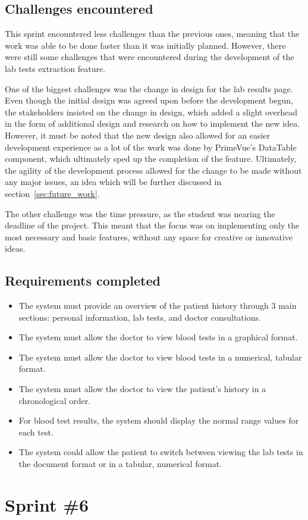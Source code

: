 
\subsection{Challenges encountered}

This sprint encountered less challenges than the previous ones, meaning that the work was able to be done faster than it was initially planned. However, there were still some challenges that were encountered during the development of the lab tests extraction feature.

One of the biggest challenges was the change in design for the lab results page. Even though the initial design was agreed upon before the development begun, the stakeholders insisted on the change in design, which added a slight overhead in the form of additional design and research on how to implement the new idea. However, it must be noted that the new design also allowed for an easier development experience as a lot of the work was done by PrimeVue's DataTable component, which ultimately sped up the completion of the feature. Ultimately, the agility of the development process allowed for the change to be made without any major issues, an idea which will be further discussed in section~\ref{sec:future_work}.

The other challenge was the time pressure, as the student was nearing the deadline of the project. This meant that the focus was on implementing only the most necessary and basic features, without any space for creative or innovative ideas.

\subsection{Requirements completed}

\begin{itemize}
  \item The system must provide an overview of the patient history through 3 main sections: personal information, lab tests, and doctor consultations.
  \item The system must allow the doctor to view blood tests in a graphical format.
  \item The system must allow the doctor to view blood tests in a numerical, tabular format.
  \item The system must allow the doctor to view the patient's history in a chronological order.
  \item For blood test results, the system should display the normal range values for each test.
  \item The system could allow the patient to switch between viewing the lab tests in the document format or in a tabular, numerical format.
\end{itemize}

\section{Sprint \#6}